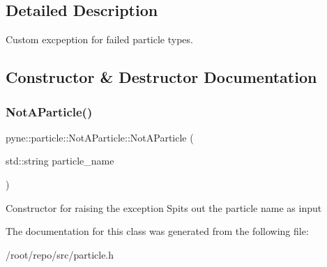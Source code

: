 \subsection{Detailed Description}
Custom excpeption for failed particle types. 

\subsection{Constructor \& Destructor Documentation}
\mbox{\label{classpyne_1_1particle_1_1_not_a_particle_a556fb7c90fc5e4c6ea1c394a86746fc9}} 
\subsubsection{\texorpdfstring{Not\+A\+Particle()}{NotAParticle()}}
{\footnotesize\ttfamily pyne\+::particle\+::\+Not\+A\+Particle\+::\+Not\+A\+Particle (\begin{DoxyParamCaption}\item[{std\+::string}]{particle\+\_\+name }\end{DoxyParamCaption})\hspace{0.3cm}{\ttfamily [inline]}}

Constructor for raising the exception Spits out the particle name as input 

The documentation for this class was generated from the following file\+:\begin{DoxyCompactItemize}
\item 
/root/repo/src/particle.\+h\end{DoxyCompactItemize}
